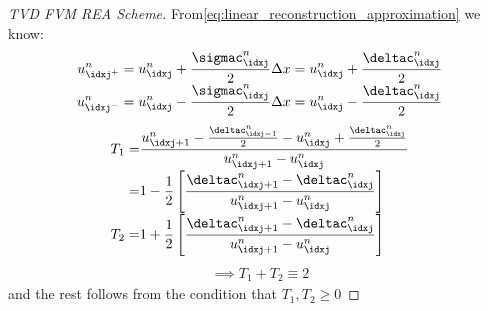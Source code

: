\begin{proofbox}\nospacing
    \begin{proof}[TVD FVM REA Scheme]\label{proof:lemma:tvd_fvm_rea_scheme}
        From\cref{eq:linear_reconstruction_approximation} we know:
        \begin{align*}
          u_{\idxj^{+}}^{n}&=u_{\idxj}^{n}+\frac{\sigmac_{\idxj}^{n}}{2}\Delta x=u_{\idxj}^{n}+\frac{\deltac_{\idxj}^{n}}{2}\\[-1\jot]
          u_{\idxj^{-}}^{n}&=u_{\idxj}^{n}-\frac{\sigmac_{\idxj}^{n}}{2}\Delta x=u_{\idxj}^{n}-\frac{\deltac_{\idxj}^{n}}{2}
        \end{align*}
        \begin{align*}
          T_{1}=&\frac{u_{\idxj+1}^{n}-\frac{\deltac_{\idxj-1}^{n}}{2}-u_{\idxj}^{n}+\frac{\deltac_{\idxj}^{n}}{2}}{u_{\idxj+1}^{n}-u_{\idxj}^{n}}\\[-1\jot]
          =&1-\frac{1}{2}\left[\frac{\deltac_{\idxj+1}^{n}-\deltac_{\idxj}^{n}}{u_{\idxj+1}^{n}-u_{\idxj}^{n}}\right]\\[-1\jot]
          T_{2}=&1+\frac{1}{2}\left[\frac{\deltac_{\idxj+1}^{n}-\deltac_{\idxj}^{n}}{u_{\idxj+1}^{n}-u_{\idxj}^{n}}\right]
        \end{align*}
        \begin{align*}
          \implies T_{1}+T_{2}\equiv2
        \end{align*}
        and the rest follows from the condition that $T_{1},T_{2}\geq0$
    \end{proof}
\end{proofbox}
